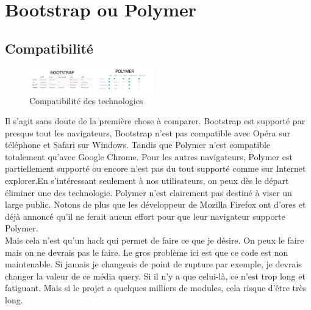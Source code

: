 \documentclass{article}
\begin{document}
\newpage
\section{Bootstrap ou Polymer}

\subsection{Compatibilit\'e}

\begin{figure}
  \vspace{-25pt}
  \begin{center}
    \includegraphics[width=0.48\textwidth]{p14}
  \end{center}
  \vspace{-20pt}
  \caption{Compatibilit\'e des technologies}
  \vspace{-10pt}
\end{figure}

Il s'agit sans doute de la premi\`ere chose \`a comparer. Bootstrap est support\'e par presque tout les navigateurs, Bootstrap n'est pas compatible avec Op\'era sur t\'el\'ephone et Safari sur Windows. Tandis que Polymer n'est compatible totalement qu'avec Google Chrome. Pour les autres navigateurs, Polymer est partiellement support\'e ou encore n'est pas du tout support\'e comme sur Internet explorer.En s'int\'eressant seulement \`a nos utilisateurs, on peux d\`es le d\'epart \'eliminer une des technologie. Polymer n'est clairement pas destin\'e \`a viser un large public. Notons de plus que les d\'eveloppeur de Mozilla Firefox ont d'ores et d\'ej\`a annonc\'e qu'il ne ferait aucun effort pour que leur navigateur supporte Polymer.\\


\newpage
Mais cela n'est qu'un hack qui permet de faire ce que je d\'esire. On peux le faire mais on ne devrais pas le faire. Le gros probl\`eme ici est que ce code est non maintenable. Si jamais je changeais de point de rupture par exemple, je devrais changer la valeur de ce m\'edia query. Si il n'y a que celui-l\`a, ce n'est trop long et fatiguant. Mais si le projet a quelques milliers de modules, cela risque d'\^etre tr\`es long.



\newpage
\end{document}
